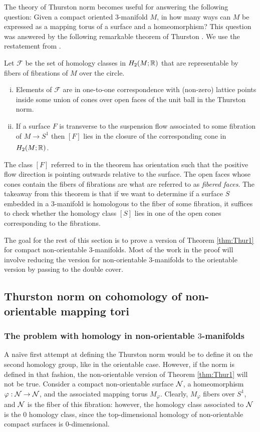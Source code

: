 The theory of Thurston norm becomes useful for answering the following question: Given a compact oriented $3$-manifold $M$, in how many ways can $M$ be expressed as a mapping torus of a surface and a homeomorphism?
This question was answered by the following remarkable theorem of Thurston \cite{thurston1986norm}.
We use the restatement from \cite{yazdi2018pseudo}.
\begin{thm}[Thurston]
  \label{thm:Thur1}
  Let $\mathcal{F}$ be the set of homology classes in $H_2(M; \mathbb{R})$ that are representable by fibers of fibrations of $M$ over the circle.
\begin{enumerate}[(i)]
\item Elements of $\mathcal{F}$ are in one-to-one correspondence with (non-zero) lattice points inside some union of cones over open faces of the unit ball in the Thurston norm.
\item If a surface $F$ is transverse to the suspension flow associated to some fibration of
  $M \xrightarrow[]{} S^1$ then $[F]$ lies in the closure of the corresponding cone in $H_2(M;\mathbb{R})$.
\end{enumerate}
\end{thm}
The class $[F]$ referred to in the theorem has orientation such that the positive flow direction is pointing outwards relative to the surface.
The open faces whose cones contain the fibers of fibrations are what are referred to as \emph{fibered faces}.
The takeaway from this theorem is that if we want to determine if a surface $S$ embedded in a $3$-manifold is homologous to the fiber of some fibration, it suffices to check whether the homology class $[S]$ lies in one of the open cones corresponding to the fibrations.

The goal for the rest of this section is to prove a version of Theorem \ref{thm:Thur1} for compact non-orientable $3$-manifolds.
Most of the work in the proof will involve reducing the version for non-orientable $3$-manifolds to the orientable version by passing to the double cover.

\subsection{Thurston norm on cohomology of non-orientable mapping tori}
\label{sec:thurst-norm-cohom}

\subsubsection*{The problem with homology in non-orientable $3$-manifolds}
A na\"ive first attempt at defining the Thurston norm would be to define it on the second homology group, like in the orientable case.
However, if the norm is defined in that fashion, the non-orientable version of Theorem \ref{thm:Thur1} will not be true.
Consider a compact non-orientable surface $\mathcal{N}$, a homeomorphism $\varphi: \mathcal{N} \to \mathcal{N}$, and the associated mapping torus $M_{\varphi}$.
Clearly, $M_{\varphi}$ fibers over $S^1$, and $\mathcal{N}$ is the fiber of this fibration: however, the homology class associated to $\mathcal{N}$ is the $0$ homology class, since the top-dimensional homology of non-orientable compact surfaces is $0$-dimensional.

